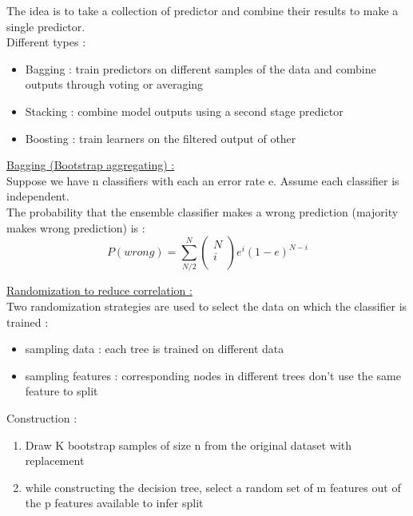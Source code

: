 \documentclass[../main.tex]{subfiles}
\begin{document}
The idea is to take a collection of predictor and combine their results to make a single predictor.\\

Different types : \begin{itemize}
    \item Bagging : train predictors on different samples of the data and combine outputs through voting or averaging\\
    \item Stacking : combine model outputs using a second stage predictor\\
    \item Boosting : train learners on the filtered output of other \\
\end{itemize}

\quad \underline{Bagging (Bootstrap aggregating) :}\\
Suppose we have n classifiers with each an error rate e. Assume each classifier is independent.\\
The probability that the ensemble classifier makes a wrong prediction (majority makes wrong prediction) is : \begin{equation}
    P(wrong) = \sum_{N/2}^N \begin{pmatrix}
        N\\ i\\
    \end{pmatrix} e^i(1-e)^{N-i}
\end{equation}

\quad \underline{Randomization to reduce correlation :}\\
Two randomization strategies are used to select the data on which the classifier is trained : \begin{itemize}
    \item sampling data : each tree is trained on different data\\
    \item sampling features : corresponding nodes in different trees don't use the same feature to split\\
\end{itemize}

Construction : \begin{enumerate}
    \item Draw K bootstrap samples of size n from the original dataset with replacement\\
    \item while constructing the decision tree, select a random set of m features out of the p features available to infer split\\
\end{enumerate}
\end{document}
